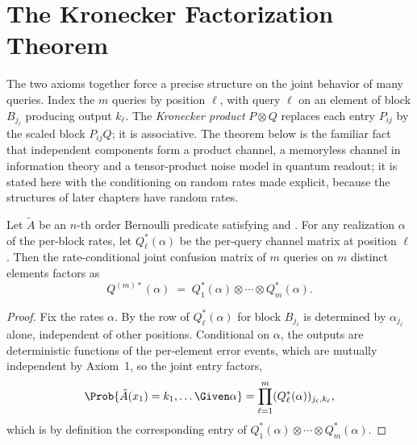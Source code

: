 %

\section{The Kronecker Factorization Theorem}
\label{sec:kronecker}

The two axioms together force a precise structure on the joint behavior of many
queries. Index the $m$ queries by position $\ell$, with query $\ell$ on an
element of block $B_{j_\ell}$ producing output $k_\ell$. The
\emph{Kronecker product} $P \otimes Q$ replaces each entry $P_{ij}$ by the
scaled block $P_{ij} Q$; it is associative. The theorem below is the familiar
fact that independent components form a product channel, a memoryless channel in
information theory and a tensor-product noise model in quantum readout; it is
stated here with the conditioning on random rates made explicit, because the
structures of later chapters have random rates.

\begin{theorem}
\label{thm:kronecker}
Let $\tilde{A}$ be an $n$-th order Bernoulli predicate satisfying
 and . For any realization
$\alpha$ of the per-block rates, let $Q^*_\ell(\alpha)$ be the per-query channel
matrix at position $\ell$. Then the rate-conditional joint confusion matrix of
$m$ queries on $m$ distinct elements factors as
\[
  Q^{(m)*}(\alpha) \;=\; Q^*_1(\alpha) \otimes \cdots \otimes Q^*_m(\alpha).
\]
\end{theorem}

\begin{proof}
Fix the rates $\alpha$. By  the row of $Q^*_\ell(\alpha)$
for block $B_{j_\ell}$ is determined by $\alpha_{j_\ell}$ alone, independent of
other positions. Conditional on $\alpha$, the outputs are deterministic
functions of the per-element error events, which are mutually independent by
Axiom~1, so the joint entry factors,
\[
  \Prob{\tilde{A}(x_1) = k_1, \ldots \Given \alpha}
  = \prod_{\ell=1}^{m} (Q^*_\ell(\alpha))_{j_\ell, k_\ell},
\]
which is by definition the corresponding entry of $Q^*_1(\alpha) \otimes \cdots
\otimes Q^*_m(\alpha)$.
\end{proof}

